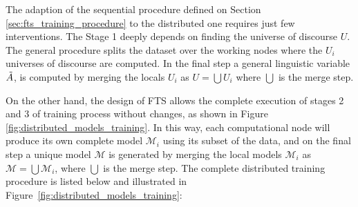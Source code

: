 The adaption of the sequential procedure defined on Section \ref{sec:fts_training_procedure} to the distributed one requires just few interventions. The Stage 1 deeply depends on finding the universe of discourse $U$. The general procedure splits the dataset over the working nodes where the $U_i$ universes of discourse are computed. In the final step a general linguistic variable $\tilde{A}$, is computed by merging the locals $U_i$ as $U = \bigcup U_i$ where $\bigcup$ is the merge step.

On the other hand, the design of FTS allows the complete execution of stages 2 and 3 of training process without changes, as shown in Figure \ref{fig:distributed_models_training}. In this way, each computational node will produce its own complete model  $\mathcal{M}_i$ using its subset of the data, and on the final step a unique model  $\mathcal{M}$ is generated by merging the local models  $\mathcal{M}_i$ as  $\mathcal{M} = \bigcup \mathcal{M}_i$, where $\bigcup$ is the merge step. The complete distributed training procedure is listed below and illustrated in Figure~\ref{fig:distributed_models_training}:

